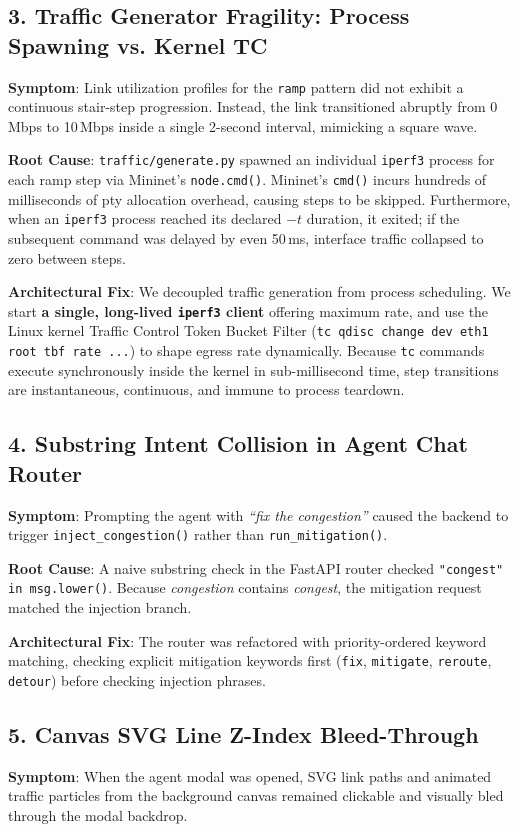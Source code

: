\subsection{3. Traffic Generator Fragility: Process Spawning vs. Kernel TC}
\textbf{Symptom}: Link utilization profiles for the \texttt{ramp} pattern did not exhibit a continuous stair-step progression. Instead, the link transitioned abruptly from 0\,Mbps to 10\,Mbps inside a single 2-second interval, mimicking a square wave.

\textbf{Root Cause}: \texttt{traffic/generate.py} spawned an individual \texttt{iperf3} process for each ramp step via Mininet's \texttt{node.cmd()}. Mininet's \texttt{cmd()} incurs hundreds of milliseconds of pty allocation overhead, causing steps to be skipped. Furthermore, when an \texttt{iperf3} process reached its declared $-t$ duration, it exited; if the subsequent command was delayed by even 50\,ms, interface traffic collapsed to zero between steps.

\textbf{Architectural Fix}: We decoupled traffic generation from process scheduling. We start \textbf{a single, long-lived \texttt{iperf3} client} offering maximum rate, and use the Linux kernel Traffic Control Token Bucket Filter (\texttt{tc qdisc change dev eth1 root tbf rate ...}) to shape egress rate dynamically. Because \texttt{tc} commands execute synchronously inside the kernel in sub-millisecond time, step transitions are instantaneous, continuous, and immune to process teardown.

\subsection{4. Substring Intent Collision in Agent Chat Router}
\textbf{Symptom}: Prompting the agent with \textit{``fix the congestion''} caused the backend to trigger \texttt{inject\_congestion()} rather than \texttt{run\_mitigation()}.

\textbf{Root Cause}: A naive substring check in the FastAPI router checked \texttt{"congest" in msg.lower()}. Because \textit{congestion} contains \textit{congest}, the mitigation request matched the injection branch.

\textbf{Architectural Fix}: The router was refactored with priority-ordered keyword matching, checking explicit mitigation keywords first (\texttt{fix}, \texttt{mitigate}, \texttt{reroute}, \texttt{detour}) before checking injection phrases.

\subsection{5. Canvas SVG Line Z-Index Bleed-Through}
\textbf{Symptom}: When the agent modal was opened, SVG link paths and animated traffic particles from the background canvas remained clickable and visually bled through the modal backdrop.

